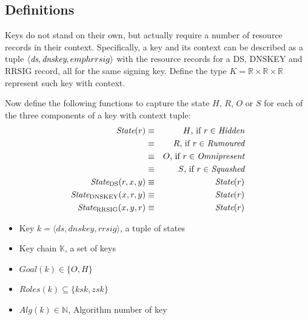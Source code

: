 \documentclass[twoside,english]{article}
\begin{document}
\subsection{Definitions}

Keys do not stand on their own, but actually require a number of resource records in
their context.  Specifically, a key and its context can be described as a tuple
$\langle\emph{ds},\emph{dnskey},emph{rrsig}\rangle$ with the resource records for
a DS, DNSKEY and RRSIG record, all for the same signing key.  Define the type
$K=\mathbb{R}\times\mathbb{R}\times\mathbb{R}$ represent such key with context.

\newcommand{\state}{\emph{State}}
\newcommand{\stateDS}{\emph{State}_\textrm{DS}}
\newcommand{\stateDNSKEY}{\emph{State}_\textrm{DNSKEY}}
\newcommand{\stateRRSIG}{\emph{State}_\textrm{RRSIG}}

Now define the following functions to capture the state $H$, $R$, $O$ or 
$S$
for each of the three components of a key with context tuple:
\begin{eqnarray*}
	\state(r) &\equiv& H\textrm{, if $r\in\emph{Hidden}$}\\
	          &\equiv& R\textrm{, if $r\in\emph{Rumoured}$}\\
	          &\equiv& O\textrm{, if $r\in\emph{Omnipresent}$}\\
	          &\equiv& S\textrm{, if $r\in\emph{Squashed}$}\\
	\stateDS(r,x,y) &\equiv& \state(r)\\
	\stateDNSKEY(x,r,y) &\equiv& \state(r)\\
	\stateRRSIG(x,y,r) &\equiv& \state(r)
\end{eqnarray*}

\begin{itemize}
	\item Key $k = \langle ds, dnskey, rrsig\rangle$, a tuple of states
	\item Key chain $\mathbb{K}$, a set of keys
	\item $Goal(k) \in \{O, H\}$
	\item $Roles(k) \subseteq \{ksk, zsk\}$
	\item $Alg(k) \in \mathbb{N}$, Algorithm number of key
\end{itemize}
\end{document}

